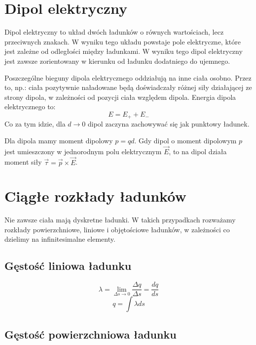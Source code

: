\documentclass{../notatki}
\begin{document}
\section{Dipol elektryczny}

Dipol elektryczny to układ dwóch ładunków o równych wartościach, lecz
przeciwnych znakach. W wyniku tego układu powstaje pole elektryczne, które
jest zależne od odległości między ładunkami. W wyniku tego dipol elektryczny
jest zawsze zorientowany w kierunku od ładunku dodatniego do ujemnego.
\begin{figure}[h]
  \centering
\end{figure}

Poszczególne bieguny dipola elektrycznego oddziałują na inne ciała osobno.
Przez to, np.: ciała pozytywnie naładowane będą doświadczały różnej siły
działającej ze strony dipola, w zależności od pozycji ciała względem dipola.
Energia dipola elektrycznego to:
$$
E = E_+ + E_-
$$
Co za tym idzie, dla $d \rightarrow 0$ dipol zaczyna zachowywać się jak
punktowy ładunek.

Dla dipola mamy moment dipolowy $p = qd$. Gdy dipol o moment dipolowym $p$ jest
umieszczony w jednorodnym polu elektrycznym $\vec{E}$, to na dipol działa moment
siły $\vec{\tau} = \vec{p} \times \vec{E}$.

\section{Ciągłe rozkłady ładunków}

Nie zawsze ciała mają dyskretne ładunki. W takich przypadkach rozważamy rozkłady
powierzchniowe, liniowe i objętościowe ładunków, w zależności co dzielimy
na infinitesimalne elementy.

\subsection{Gęstość liniowa ładunku}

$$
\lambda = \lim_{\Delta s \rightarrow 0} \frac{\Delta q}{\Delta s} =
\frac{dq}{ds}
$$
$$
q = \int \lambda ds
$$

\subsection{Gęstość powierzchniowa ładunku}
\end{document}
